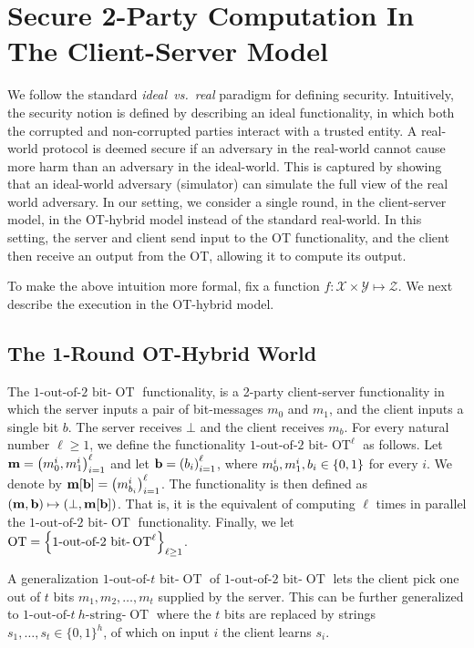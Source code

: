 \documentclass{llncs}
\newcommand{\OT}{\operatorname{OT}}
\newcommand{\bOT}[2]{#1\text{-out-of-}#2\text{ bit-}\OT}
\newcommand{\sOT}[3]{#1\text{-out-of-}#2~#3\text{-string-}\OT}
\newcommand{\X}{\mathcal{X}}
\newcommand{\Y}{\mathcal{Y}}
\renewcommand{\Z}{\mathcal{Z}}
\begin{document}
\section{Secure 2-Party Computation In The Client-Server Model}
We follow the standard \emph{ideal~vs.~real} paradigm for defining security. Intuitively, the security notion is defined by describing an ideal functionality, in which both the corrupted and non-corrupted parties interact with a trusted entity. A real-world protocol is deemed secure if an adversary in the real-world cannot cause more harm than an adversary in the ideal-world. This is captured by showing that an ideal-world adversary (simulator) can simulate the full view of the real world adversary. In our setting, we consider a single round, in the client-server model, in the OT-hybrid model instead of the standard real-world. In this setting, the server and client send input to the OT functionality, and the client then receive an output from the OT, allowing it to compute its output.

To make the above intuition more formal, fix a function $f:\X\times\Y\mapsto\Z$. %
We next describe the execution in the OT-hybrid model.

\subsection*{The 1-Round OT-Hybrid World}
The $\bOT12$ functionality, is a 2-party client-server functionality in which the server inputs a pair of bit-messages $m_0$ and $m_1$, and the client inputs a single bit $b$. The server receives $\bot$ and the client receives $m_b$. For every natural number $\ell\geq1$, we define the functionality $\bOT12^{\ell}$ as follows. Let ${\bf m}=\left ( m_0^i,m_1^i \right )_{i=1}^{\ell}$ and let ${\bf b}=\left ( b_i \right )_{i=1}^{\ell}$, where $m_0^i,m_1^i,b_i\in\{0,1\}$ for every $i$. We denote by ${\bf m}[{\bf b}]=\left ( m^i_{b_i} \right )_{i=1}^{\ell}$. The functionality is then defined as $\left ( {\bf m},{\bf b} \right )\mapsto\left ( \bot,{\bf m}[{\bf b}] \right )$. That is, it is the equivalent of computing $\ell$ times in parallel the $\bOT12$ functionality. Finally, we let $\OT=\set{\bOT12^{\ell}}_{\ell\geq1}$.

A generalization $\bOT{1}{t}$ of $\bOT{1}{2}$ lets the client pick one out of $t$ bits $m_1,m_2,\ldots,m_t$ supplied by the server.
This can be further generalized to $\sOT{1}{t}{h}$ where the $t$ bits are replaced by strings $s_1,\ldots,s_t\in \{0,1\}^h$, of which on input $i$ the client learns $s_i$.
\end{document}
